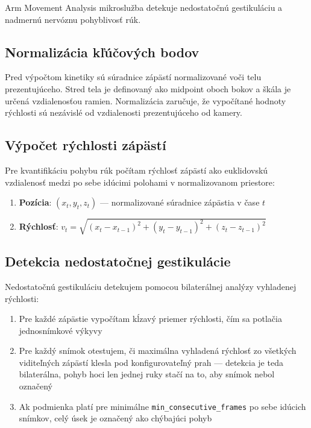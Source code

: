 Arm Movement Analysis mikroslužba detekuje nedostatočnú gestikuláciu a nadmernú nervóznu pohyblivosť rúk.

\subsection{Normalizácia kľúčových bodov}

Pred výpočtom kinetiky sú súradnice zápästí normalizované voči telu prezentujúceho. Stred tela je definovaný ako midpoint oboch bokov a škála je určená vzdialenosťou ramien. Normalizácia zaručuje, že vypočítané hodnoty rýchlosti sú nezávislé od vzdialenosti prezentujúceho od kamery.

\subsection{Výpočet rýchlosti zápästí}

Pre kvantifikáciu pohybu rúk počítam rýchlosť zápästí ako euklidovskú vzdialenosť medzi po sebe idúcimi polohami v normalizovanom priestore:

\begin{enumerate}
    \item \textbf{Pozícia}: $(x_t, y_t, z_t)$ --- normalizované súradnice zápästia v čase $t$
    \item \textbf{Rýchlosť}: $v_t = \sqrt{(x_t - x_{t-1})^2 + (y_t - y_{t-1})^2 + (z_t - z_{t-1})^2}$
\end{enumerate}

\subsection{Detekcia nedostatočnej gestikulácie}

Nedostatočnú gestikuláciu detekujem pomocou bilaterálnej analýzy vyhladenej rýchlosti:

\begin{enumerate}
    \item Pre každé zápästie vypočítam kĺzavý priemer rýchlosti, čím sa potlačia jednosnímkové výkyvy
    \item Pre každý snímok otestujem, či maximálna vyhladená rýchlosť zo všetkých viditeľných zápästí klesla pod konfigurovateľný prah --- detekcia je teda bilaterálna, pohyb hoci len jednej ruky stačí na to, aby snímok nebol označený
    \item Ak podmienka platí pre minimálne \texttt{min\_consecutive\_frames} po sebe idúcich snímkov, celý úsek je označený ako chýbajúci pohyb
\end{enumerate}

